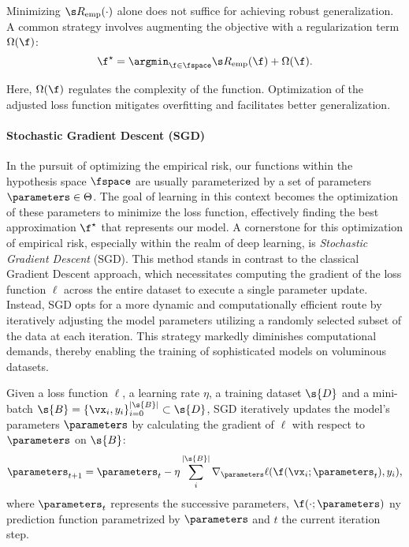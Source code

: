 Minimizing $\emprisk(\cdot)$ alone does not suffice for achieving robust generalization. A common strategy involves augmenting the objective with a regularization term $\Omega(\f)$:
\[
\f^\star = \argmin_{\f \in \fspace} \emprisk(\f) + \Omega(\f).
\]

Here, $\Omega(\f)$ regulates the complexity of the function. Optimization of the adjusted loss function mitigates overfitting and facilitates better generalization. 



\paragraph{Stochastic Gradient Descent (SGD)}

In the pursuit of optimizing the empirical risk, our functions within the hypothesis space $\fspace$ are usually parameterized by a set of parameters $\parameters \in \Theta$. The goal of learning in this context becomes the optimization of these parameters to minimize the loss function, effectively finding the best approximation $\f^\star$ that represents our model. A cornerstone for this optimization of empirical risk, especially within the realm of deep learning, is \textit{Stochastic Gradient Descent} (SGD). This method stands in contrast to the classical Gradient Descent approach, which necessitates computing the gradient of the loss function $\ell$ across the entire dataset to execute a single parameter update. Instead, SGD opts for a more dynamic and computationally efficient route by iteratively adjusting the model parameters utilizing a randomly selected subset of the data at each iteration. This strategy markedly diminishes computational demands, thereby enabling the training of sophisticated models on voluminous datasets.

\begin{definition}[SGD]
Given a loss function $\ell$, a learning rate $\eta$, a training dataset $\s{D}$ and a mini-batch $\s{B} = \{ \vx_i, y_i \}_{i=0}^{|\s{B}|} \subset \s{D}$, SGD iteratively updates the model's parameters $\parameters$ by calculating the gradient of $\ell$ with respect to $\parameters$ on $\s{B}$:
\[
\parameters_{t+1} = \parameters_t - \eta \sum_i^{|\s{B}|} \nabla_{\parameters}  \ell(\f(\vx_i; \parameters_t), y_i),
\]
where $\parameters_{t}$ represents the successive parameters, $\f(\cdot; \parameters)$ ny prediction function parametrized by $\parameters$ and $t$ the current iteration step.
\end{definition}

